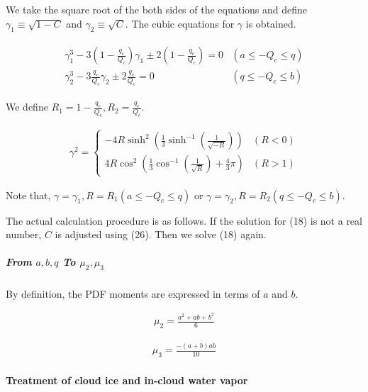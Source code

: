 We take the square root of the both sides of the equations and define
\(\gamma_{1} \equiv\sqrt{1-C}\) and \(\gamma_{2} \equiv\sqrt{C}\). The
cubic equations for \(\gamma\) is obtained.

\begin{eqnarray}
\begin{array}{ll}
\gamma_{1}^{3}-3\left(1-\frac{q_{c}}{Q_{c}}\right) \gamma_{1} \pm 2\left(1-\frac{q_{c}}{Q_{c}}\right)=0 & \left(a \leq-Q_{c} \leq q\right) \\
\gamma_{2}^{3}-3 \frac{q_{c}}{Q_{c}} \gamma_{2} \pm 2 \frac{q_{c}}{Q_{c}}=0 & \left(q \leq-Q_{c} \leq b\right)
\end{array}
\end{eqnarray}

We define \(R_{1}=1-\frac{q_{c}}{Q_{c}}, R_{2}=\frac{q_{c}}{Q_{c}}\).

\begin{eqnarray}
\gamma^{2}=\left\{\begin{array}{ll}
-4 R \sinh ^{2}\left(\frac{1}{3} \sinh ^{-1}\left(\frac{1}{\sqrt{-R}}\right)\right) & (R<0) \\
4 R \cos ^{2}\left(\frac{1}{3} \cos ^{-1}\left(\frac{1}{\sqrt{R}}\right)+\frac{4}{3} \pi\right) & (R>1)
\end{array}\right.
\label{E08-26}
\end{eqnarray}

Note that,
\(\gamma=\gamma_{1}, R=R_{1}\left(a \leq-Q_{c} \leq q\right)\) or
\(\gamma=\gamma_{2}, R=R_{2}\left(q \leq-Q_{c} \leq b\right)\).

The actual calculation procedure is as follows. If the solution for (18)
is not a real number, \(C\) is adjusted using (26). Then we solve (18)
again.

\hypertarget{from-abq-to-mu_2-mu_3}{%
\subparagraph{\texorpdfstring{From \(a,b,q\) To
\(\mu_{2}, \mu_{3}\)}{From a,b,q To \textbackslash mu\_\{2\}, \textbackslash mu\_\{3\}}}\label{from-abq-to-mu_2-mu_3}}

By definition, the PDF moments are expressed in terms of \(a\) and
\(b\).

\begin{eqnarray}
\mu_{2}=\frac{a^{2}+ab+b^{2}}{6}
\end{eqnarray}

\begin{eqnarray}
\mu_{3}=\frac{-(a+b) ab}{10}
\end{eqnarray}

\hypertarget{treatment-of-cloud-ice-and-in-cloud-water-vapor}{%
\paragraph{Treatment of cloud ice and in-cloud water
vapor}\label{treatment-of-cloud-ice-and-in-cloud-water-vapor}}

